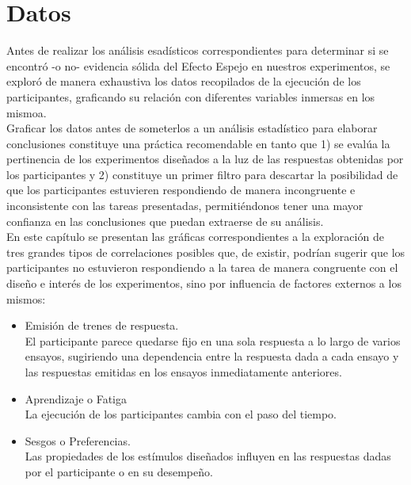 
\chapter{Datos} %

\label{Cap_Data} %


Antes de realizar los análisis esadísticos correspondientes para determinar si se encontró -o no- evidencia sólida del Efecto Espejo en nuestros experimentos, se exploró de manera exhaustiva los datos recopilados de la ejecución de los participantes, graficando su relación con diferentes variables inmersas en los mismoa.\\ 

Graficar los datos antes de someterlos a un análisis estadístico para elaborar conclusiones constituye una práctica recomendable en tanto que 1) se evalúa la pertinencia de los experimentos diseñados a la luz de las respuestas obtenidas por los participantes y 2) constituye un primer filtro para descartar la posibilidad de que los participantes estuvieren respondiendo de manera incongruente e inconsistente con las tareas presentadas, permitiéndonos tener una mayor confianza en las conclusiones que puedan extraerse de su análisis.\\

En este capítulo se presentan las gráficas correspondientes a la exploración de tres grandes tipos de correlaciones posibles que, de existir, podrían sugerir que los participantes no estuvieron respondiendo a la tarea de manera congruente con el diseño e interés de los experimentos, sino por influencia de factores externos a los mismos: 

\begin{itemize}
\item Emisión de trenes de respuesta.\\

El participante parece quedarse fijo en una sola respuesta a lo largo de varios ensayos, sugiriendo una dependencia entre la respuesta dada a cada ensayo y las respuestas emitidas en los ensayos inmediatamente anteriores.

\item Aprendizaje o Fatiga\\

La ejecución de los participantes cambia con  el paso del tiempo.

\item Sesgos o Preferencias.\\

Las propiedades de los estímulos diseñados influyen en las respuestas dadas por el participante o en su desempeño.  
\end{itemize}

